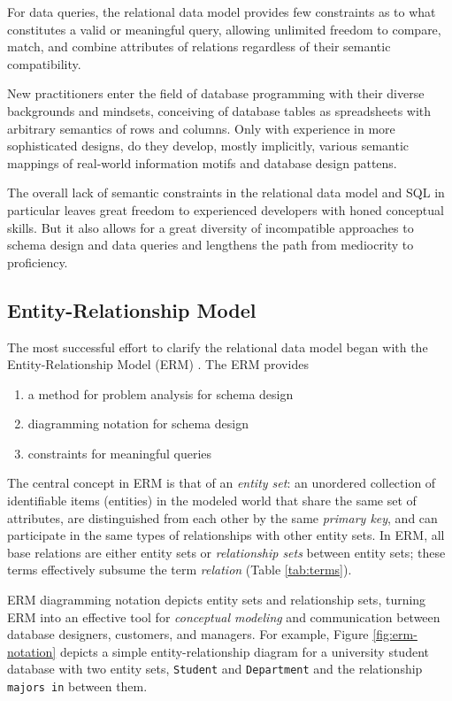 \documentclass[letter,10pt]{article}
\begin{document}
For data queries, the relational data model provides few constraints as to what constitutes a valid or meaningful query, allowing unlimited freedom to compare, match, and combine attributes of relations regardless of their semantic compatibility.

New practitioners enter the field of database programming with their diverse backgrounds and mindsets, conceiving of database tables as spreadsheets with arbitrary semantics of rows and columns.  
Only with experience in more sophisticated designs, do they develop, mostly implicitly, various semantic mappings of real-world information motifs and database design pattens.

The overall lack of semantic constraints in the relational data model and SQL in particular leaves great freedom to experienced developers with honed conceptual skills. But it also allows for a great diversity of incompatible approaches to schema design and data queries and lengthens the path from mediocrity to proficiency.

\subsection{Entity-Relationship Model}
The most successful effort to clarify the relational data model began with the Entity-Relationship Model (ERM) \citep{chen_entity_1976}.  
The ERM provides 
\begin{enumerate}
\item a method for problem analysis for schema design 
\item diagramming notation for schema design 
\item constraints for meaningful queries
\end{enumerate}

The central concept in ERM is that of an {\em entity set}: an unordered collection of identifiable items (entities) in the modeled world that share the same set of attributes, are distinguished from each other by the same \emph{primary key}, and can participate in the same types of relationships with other entity sets. 
In ERM, all base relations are either entity sets or \emph{relationship sets} between entity sets; these terms effectively subsume the term \emph{relation} (Table \ref{tab:terms}).

ERM diagramming notation depicts entity sets and relationship sets, turning ERM into an effective tool for \emph{conceptual modeling} and communication between database designers, customers, and managers.
For example, Figure \ref{fig:erm-notation} depicts a simple entity-relationship diagram for a university student database with two entity sets, {\tt Student} and {\tt Department} and the relationship {\tt majors in} between them.
\end{document}
